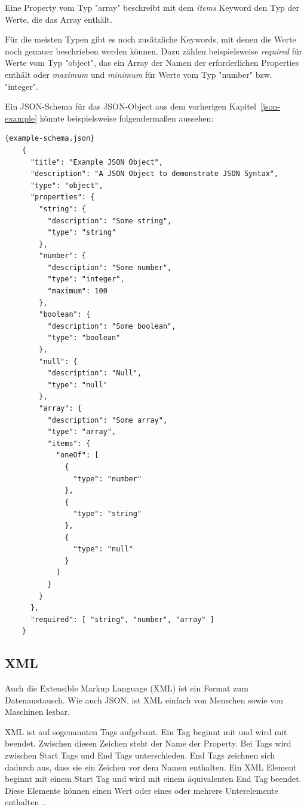  Eine Property vom Typ "array" beschreibt mit dem \textit{items} Keyword den Typ der Werte, die das Array enthält.

 Für die meisten Typen gibt es noch zusätzliche Keywords, mit denen die Werte noch genauer beschrieben werden können.
 Dazu zählen beispielsweise \textit{required} für Werte vom Typ "object", das ein Array der Namen der erforderlichen
 Properties enthält oder \textit{maximum} und \textit{minimum} für Werte vom Typ "number" bzw. "integer".

 Ein JSON-Schema für das JSON-Object aus dem vorherigen Kapitel~\ref{json-example} könnte beispielsweise
 folgendermaßen aussehen:

 \begin{lstlisting}[label={lst:example-schema.json}]{example-schema.json}
    {
      "title": "Example JSON Object",
      "description": "A JSON Object to demonstrate JSON Syntax",
      "type": "object",
      "properties": {
        "string": {
          "description": "Some string",
          "type": "string"
        },
        "number": {
          "description": "Some number",
          "type": "integer",
          "maximum": 100
        },
        "boolean": {
          "description": "Some boolean",
          "type": "boolean"
        },
        "null": {
          "description": "Null",
          "type": "null"
        },
        "array": {
          "description": "Some array",
          "type": "array",
          "items": {
            "oneOf": [
              {
                "type": "number"
              },
              {
                "type": "string"
              },
              {
                "type": "null"
              }
            ]
          }
        }
      },
      "required": [ "string", "number", "array" ]
    }
 \end{lstlisting}

\subsection{XML}
Auch die Extensible Markup Language (XML) ist ein Format zum Datenaustausch.
Wie auch JSON, ist XML einfach von Menschen sowie von Maschinen lesbar.

XML ist auf sogenannten Tags aufgebaut.
Ein Tag beginnt mit \textit{\<} und wird mit \textit{\>} beendet.
Zwischen diesen Zeichen steht der Name der Property.
Bei Tags wird zwischen Start Tags und End Tags unterschieden.
End Tags zeichnen sich dadurch aus, dass sie ein \textit{\/} Zeichen vor dem Namen enthalten.
Ein XML Element beginnt mit einem Start Tag und wird mit einem äquivalenten End Tag beendet.
Diese Elemente können einen Wert oder eines oder mehrere Unterelemente enthalten~\cite{xml}.

